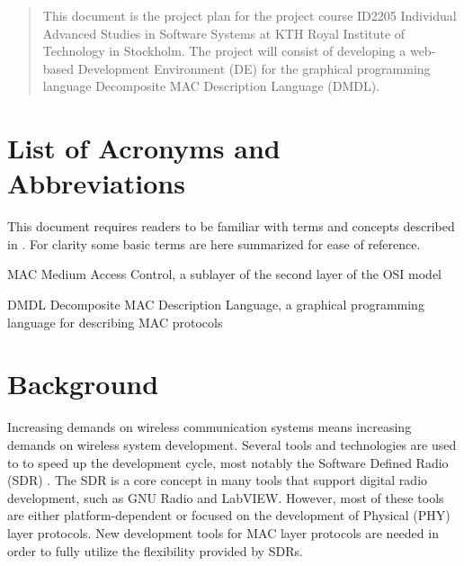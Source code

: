 \documentclass[12pt,twoside]{article}
\begin{document}
\maketitle


\begin{abstract}
\label{sec:abstract}

This document is the project plan for the project course ID2205 Individual Advanced Studies in Software Systems at KTH Royal Institute of Technology in Stockholm.
The project will consist of developing a web-based Development Environment (DE) for the graphical programming language Decomposite MAC Description Language (DMDL).
\end{abstract}


\clearpage




\tableofcontents


\section*{List of Acronyms and Abbreviations}
\label{sec:acronyms}

This document requires readers to be familiar with terms and concepts described in \cite{dmdl}. For clarity some basic terms are here summarized for ease of reference.
\begin{basedescript}{\desclabelstyle{\pushlabel}\desclabelwidth{10em}}
\item[MAC] Medium Access Control, a sublayer of the second layer of the OSI model\cite{osi}
\item[DMDL] Decomposite MAC Description Language, a graphical programming language for describing MAC protocols
\end{basedescript}


\clearpage


\section{Background}
\label{sec:background}

Increasing demands on wireless communication systems means increasing demands on wireless system development. Several tools and technologies are used
to to speed up the development cycle, most notably the Software Defined Radio (SDR) \cite{sdr}. The SDR is a core concept in many tools that support
digital radio development, such as GNU Radio and LabVIEW. However, most of these tools are either platform-dependent or
focused on the development of Physical (PHY) layer protocols. New development tools for MAC layer protocols are needed in order to fully utilize
the flexibility provided by SDRs.
\end{document}

